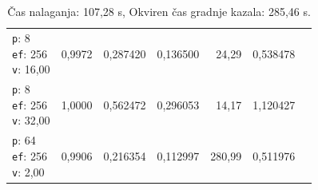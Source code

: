 \begin{table}[htbp]
\begin{tabularx}{\textwidth}{Xrrrrrr}
    \makecell{\texttt{p}: 8\\\texttt{ef}: 256\\\texttt{v}: 16,00} & 0,9972 & 0,287420 & 0,136500 & 24,29 & 0,538478 \\
    \makecell{\texttt{p}: 8\\\texttt{ef}: 256\\\texttt{v}: 32,00} & 1,0000 & 0,562472 & 0,296053 & 14,17 & 1,120427 \\
    \makecell{\texttt{p}: 64\\\texttt{ef}: 256\\\texttt{v}: 2,00} & 0,9906 & 0,216354 & 0,112997 & 280,99 & 0,511976 \\
    \bottomrule
  \end{tabularx}
\caption* {Čas nalaganja: 107,28 s, Okviren čas gradnje kazala: 285,46 s.}\end{table}


